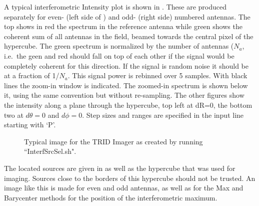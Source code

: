 A typical interferometric Intensity plot is shown in . These are produced separately for even- (left side of ) and odd- (right side) numbered antennas. The top shows in red the spectrum in the reference antenna while green shows the coherent sum of all antennas in the field, beamed towards the central pixel of the hypercube. The green spectrum is normalized by the number of antennas ($N_a$, i.e.\ the geen and red should fall on top of each other if the signal would be completely coherent for this direction. If the signal is random noise it should be at a fraction of 1/$N_a$. This signal power is rebinned over 5 samples. With black lines the zoom-in window is indicated. The zoomed-in spectrum is shown below it, using the same convention but without re-sampling. The other figures show the intensity along a plane through the hypercube, top left at dR=0, the bottom two at $d\theta=0$ and $d\phi=0$. Step sizes and ranges are specified in the input line starting with `P'.

\begin{figure}[th]
	\caption{Typical image for the TRID Imager as created by running ``InterfSrcSel.sh".}	 
\end{figure}

The located sources are given in  as well as the hypercube that was used for imaging. Sources close to the borders of this hypercube should not be trusted. An image like this is made for even and odd antennas, as well as for the Max and Barycenter methods for the position of the interferometric maximum.

